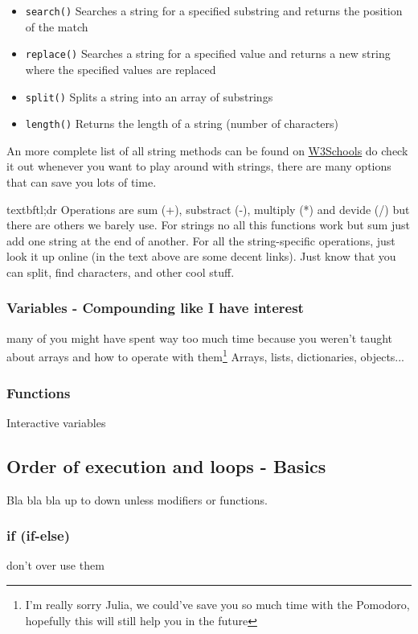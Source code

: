 \begin{itemize}
    \item \texttt{search()} Searches a string for a specified substring and returns the position of the match
    \item \texttt{replace()} Searches a string for a specified value and returns a new string where the specified values are replaced
    \item \texttt{split()} Splits a string into an array of substrings
    \item \texttt{length()} Returns the length of a string (number of characters)
\end{itemize}

An more complete list of all string methods can be found on \href{https://www.w3schools.com/jsref/jsref_obj_string.asp}{W3Schools} do check it out whenever you want to play around with strings, there are many options that can save you lots of time.

\large{textbf{tl;dr}}
Operations are sum (+), substract (-), multiply (*) and devide (/) but there are others we barely use. For strings no all this functions work but sum just add one string at the end of another. For all the string-specific operations, just look it up online (in the text above are some decent links). Just know that you can split, find characters, and other cool stuff.

\subsubsection{Variables - Compounding like I have interest} 
\label{subsub:array}
many of you might have spent way too much time because you weren't taught about arrays and how to operate with them\footnote{I'm really sorry Julia, we could've save you so much time with the Pomodoro, hopefully this will still help you in the future}
Arrays, lists, dictionaries, objects...
\subsubsection{Functions}
\label{subsub:functions}
Interactive variables

\subsection{Order of execution and loops - Basics}
\label{sub:execBasic}
Bla bla bla up to down unless modifiers or functions.
\subsubsection{if (if-else)}
\label{subsub:if}
don't over use them

